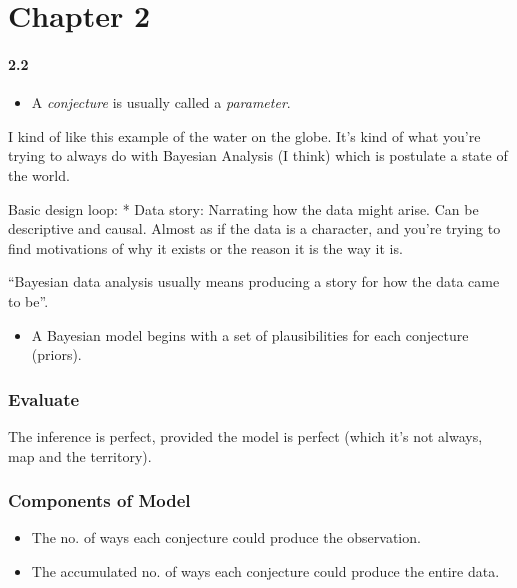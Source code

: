 \documentclass[11pt]{article}
\begin{document}
\hypertarget{chapter-2}{%
\section{Chapter 2}\label{chapter-2}}

\hypertarget{section-1}{%
\paragraph{2.2}\label{section-1}}

\begin{itemize}
\tightlist
\item
  A \emph{conjecture} is usually called a \emph{parameter}.
\end{itemize}

I kind of like this example of the water on the globe. It's kind of what
you're trying to always do with Bayesian Analysis (I think) which is
postulate a state of the world.

Basic design loop: * Data story: Narrating how the data might arise. Can
be descriptive and causal. Almost as if the data is a character, and
you're trying to find motivations of why it exists or the reason it is
the way it is.

``Bayesian data analysis usually means producing a story for how the
data came to be''.

\begin{itemize}
\tightlist
\item
  A Bayesian model begins with a set of plausibilities for each
  conjecture (priors).
\end{itemize}

\hypertarget{evaluate}{%
\subsubsection{Evaluate}\label{evaluate}}

The inference is perfect, provided the model is perfect (which it's not
always, map and the territory).

\hypertarget{components-of-model}{%
\subsubsection{Components of Model}\label{components-of-model}}

\begin{itemize}
\tightlist
\item
  The no. of ways each conjecture could produce the observation.
\item
  The accumulated no. of ways each conjecture could produce the entire
  data.
\end{itemize}
\end{document}
